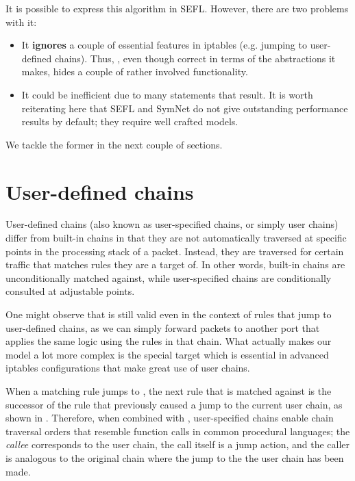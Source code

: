 It is possible to express this algorithm in SEFL.  However, there are two
problems with it:
\begin{itemize}
  \item It \textbf{ignores} a couple of essential features in iptables (e.g.
    jumping to user-defined chains).  Thus,
    , even though correct in terms of the
    abstractions it makes, hides a couple of rather involved functionality.
  \item It could be inefficient due to many  statements
    that result.  It is worth reiterating here that SEFL and SymNet do not give
    outstanding performance results by default; they require well crafted
    models.
\end{itemize}

We tackle the former in the next couple of sections.


\section{User-defined chains}

User-defined chains (also known as user-specified chains, or simply user chains)
differ from built-in chains in that they are not automatically traversed at
specific points in the processing stack of a packet.  Instead, they are
traversed for certain traffic that matches rules they are a target of.  In
other words, built-in chains are unconditionally matched against, while
user-specified chains are conditionally consulted at adjustable points.

One might observe that  is still
valid even in the context of rules that jump to user-defined chains, as we can
simply forward packets to another port that applies the same logic using the
rules in that chain.  What actually makes our model a lot more complex is the
special \RETURN target which is essential in advanced iptables configurations
that make great use of user chains.

When a matching rule jumps to \RETURN, the next rule that is matched against is
the successor of the rule that previously caused a jump to the current user
chain, as shown in .
Therefore, when combined with \RETURN, user-specified chains enable chain
traversal orders that resemble function calls in common procedural languages;
the \emph{callee} corresponds to the user chain, the call itself is a jump
action, and the caller is analogous to the original chain where the jump to the
the user chain has been made.

